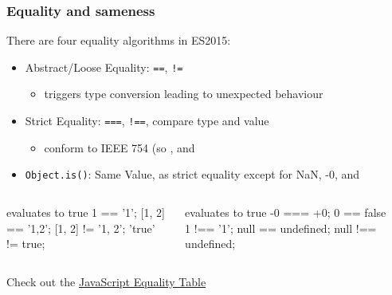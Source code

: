 \begin{frame}[fragile]
  \frametitle{Equality and sameness}
  There are four equality algorithms in ES2015:
  \begin{itemize}
    \item Abstract/Loose Equality: \verb|==|, \verb|!=|
    \begin{itemize}
      \item triggers type conversion leading to unexpected behaviour
    \end{itemize}
    \item Strict Equality: \verb|===|, \verb|!==|, compare type and value
    \begin{itemize}
      \item conform to IEEE 754 (so , and 
    \end{itemize}
    \item \verb|Object.is()|: Same Value, as strict equality except for {NaN, -0,} and 
  \end{itemize}
\begin{columns}[onlytextwidth]
  \begin{column}{0.45\textwidth}
\begin{CodeBox}{evaluates to true}
  1 == '1';
  [1, 2] == '1,2';
  [1, 2] != '1, 2';
  'true' != true;
\end{CodeBox}
  \end{column}
  \begin{column}{0.45\textwidth}
\begin{CodeBox}{evaluates to true}
  -0 === +0;
  0 == false
  1 !== '1';
  null == undefined;
  null !== undefined;
\end{CodeBox}
  \end{column}
  \begin{column}{0.3\textwidth}  \end{column}
\end{columns}%
Check out the \href{https://dorey.github.io/JavaScript-Equality-Table/}{JavaScript Equality Table} 
\end{frame}
